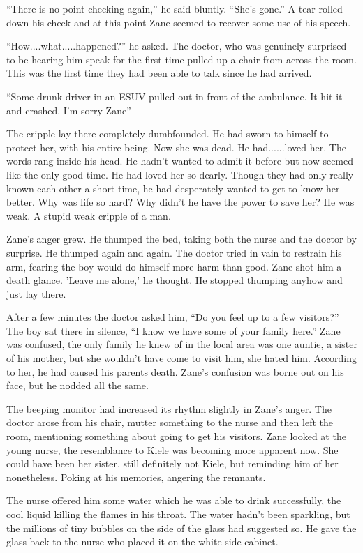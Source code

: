 ``There is no point checking again,'' he said bluntly.  ``She's gone.''  A tear rolled down his cheek and at this point Zane seemed to recover some use of his speech.

``How....what.....happened?'' he asked.  The doctor, who was genuinely surprised to be hearing him speak for the first time pulled up a chair from across the room.  This was the first time they had been able to talk since he had arrived.

``Some drunk driver in an ESUV pulled out in front of the ambulance.  It hit it and crashed.  I'm sorry Zane''

The cripple lay there completely dumbfounded.  He had sworn to himself to protect her, with his entire being.  Now she was dead.  He had......loved her.  The words rang inside his head.  He hadn't wanted to admit it before but now seemed like the only good time.  He had loved her so dearly.  Though they had only really known each other a short time, he had desperately wanted to get to know her better.  Why was life so hard?  Why didn't he have the power to save her?  He was weak.  A stupid weak cripple of a man.  

Zane's anger grew.  He thumped the bed, taking both the nurse and the doctor by surprise.  He thumped again and again.  The doctor tried in vain to restrain his arm, fearing the boy would do himself more harm than good.  Zane shot him a death glance.  'Leave me alone,' he thought.  He stopped thumping anyhow and just lay there.  

After a few minutes the doctor asked him, ``Do you feel up to a few visitors?'' The boy sat there in silence, ``I know we have some of your family here.''  Zane was confused, the only family he knew of in the local area was one auntie, a sister of his mother, but she wouldn't have come to visit him, she hated him.  According to her, he had caused his parents death.  Zane's confusion was borne out on his face, but he nodded all the same.  

The beeping monitor had increased its rhythm slightly in Zane's anger.  The doctor arose from his chair, mutter something to the nurse and then left the room, mentioning something about going to get his visitors.  Zane looked at the young nurse, the resemblance to Kiele was becoming more apparent now.  She could have been her sister, still definitely not Kiele, but reminding him of her nonetheless.  Poking at his memories, angering the remnants.

The nurse offered him some water which he was able to drink successfully, the cool liquid killing the flames in his throat.  The water hadn't been sparkling, but the millions of tiny bubbles on the side of the glass had suggested so.  He gave the glass back to the nurse who placed it on the white side cabinet.

